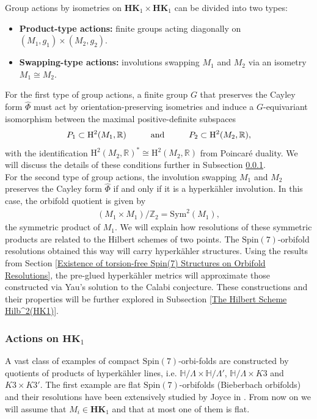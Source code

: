 \documentclass[psamsfonts]{amsart}
\theoremstyle{plain}
\theoremstyle{definition}{
\newtheorem{defi}{Definition}[section]
\newtheorem{ass}{Assumption}
\newtheorem*{nota}{Notation}}
\theoremstyle{remark}{
\newtheorem{rem}{Remark}
\newtheorem{ex}{Example}}
\theoremstyle{plain}{
\newtheorem{thm}{Theorem}[section]
\newtheorem{lem}{Lemma}[section]
\newtheorem{cor}{Corollary}[section]
\newtheorem{prop}{Proposition}[section]
\newtheorem{con}{Conjecture}[section]}
\newcommand{\m}[1]{{\mathrm{#1}}}
\newcommand{\cat}[1]{\textbf{#1}}
\newcommand{\und}[1]{\hspace{#1}\text{and}\hspace{#1}}
\begin{document}
Group actions by isometries on $\cat{HK}_1 \times \cat{HK}_1$ can be divided into two types:
\begin{itemize}
    \item \textbf{Product-type actions:} finite groups acting diagonally on $(M_1, g_1) \times (M_2, g_2)$.
    \item \textbf{Swapping-type actions:} involutions swapping $M_1$ and $M_2$ via an isometry $M_1 \cong M_2$.
\end{itemize}

For the first type of group actions, a finite group $G$ that preserves the Cayley form $\hat{\Phi}$ must act by orientation-preserving isometries and induce a $G$-equivariant isomorphism between the maximal positive-definite subspaces
\begin{align*}
    P_1 \subset \m{H}^2(M_1, \mathbb{R}) \und{1.0cm} P_2 \subset \m{H}^2(M_2, \mathbb{R}),
\end{align*}
with the identification $\m{H}^2(M_2, \mathbb{R})^* \cong \m{H}^2(M_2, \mathbb{R})$ from Poincaré duality. We will discuss the details of these conditions further in Subsection \ref{Actions on HK1}.\\

For the second type of group actions, the involution swapping $M_1$ and $M_2$ preserves the Cayley form $\hat{\Phi}$ if and only if it is a hyperkähler involution. In this case, the orbifold quotient is given by
\begin{align*}
    (M_1 \times M_1) / \mathbb{Z}_2 = \m{Sym}^2(M_1),
\end{align*}
the symmetric product of $M_1$. We will explain how resolutions of these symmetric products are related to the Hilbert schemes of two points. The $\m{Spin}(7)$-orbifold resolutions obtained this way will carry hyperkähler structures. Using the results from Section \ref{Existence of torsion-free Spin(7) Structures on Orbifold Resolutions}, the pre-glued hyperkähler metrics will approximate those constructed via Yau’s solution to the Calabi conjecture. These constructions and their properties will be further explored in Subsection \ref{The Hilbert Scheme Hilb^2(HK1)}.\\



\subsubsection{Actions on $\cat{HK}_1$}
\label{Actions on HK1}

A vast class of examples of compact $\m{Spin}(7)$-orbi-folds are constructed by quotients of products of hyperkähler lines, i.e. $\mathbb{H}/\Lambda\times \mathbb{H}/\Lambda'$, $\mathbb{H}/\Lambda\times K3 $ and $K3\times K3'$. The first example are flat $\m{Spin}(7)$-orbifolds (Bieberbach orbifolds) and their resolutions have been extensively studied by Joyce in \cite{joyce2000compact}. From now on we will assume that $M_i\in\cat{HK}_1$ and that at most one of them is flat.\\
\end{document}
